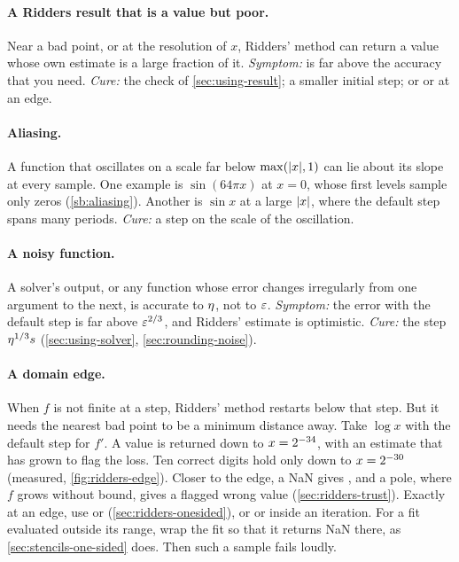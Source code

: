 \paragraph{A Ridders result that is a value but poor.} Near a bad point, or at the resolution of $x$, Ridders'
method can return a value whose own estimate is a large fraction of it. \emph{Symptom:}  is far
above the accuracy that you need. \emph{Cure:} the check of \cref{sec:using-result}; a smaller initial step; or
 or  at an edge.


\paragraph{Aliasing.} A function that oscillates on a scale far below $\max(\lvert x \rvert, 1)$ can lie about its slope
at every sample. One example is $\sin(64 \pi x)$ at $x = 0$, whose first levels sample only zeros
(\cref{sb:aliasing}). Another is $\sin x$ at a large $\lvert x \rvert$, where the default step spans many periods.
\emph{Cure:} a step on the scale of the oscillation.

\paragraph{A noisy function.} A solver's output, or any function whose error changes irregularly from one argument
to the next, is accurate to $\eta$, not to $\varepsilon$.
\emph{Symptom:} the error with the default step is far above $\varepsilon^{2/3}$, and Ridders' estimate is optimistic.
\emph{Cure:} the step $\eta^{1/3} s$
(\cref{sec:using-solver}, \cref{sec:rounding-noise}).

\paragraph{A domain edge.} When $f$ is not finite at a step, Ridders' method restarts below that step. But it needs
the nearest bad point to be a minimum distance away. Take $\log x$ with the default step for $f'$. A value is
returned down to $x = 2^{-\num{34}}$, with an estimate that has grown to flag the loss.
Ten correct digits hold only down to $x = 2^{-\num{30}}$ (measured,
\cref{fig:ridders-edge}). Closer to the edge, a NaN gives , and a pole, where $f$ grows without
bound, gives a flagged wrong value (\cref{sec:ridders-trust}). Exactly at an edge, use  or
 (\cref{sec:ridders-onesided}), or  or  inside an
iteration. For a fit evaluated outside its range, wrap the fit so that it returns NaN there, as
\cref{sec:stencils-one-sided} does. Then such a sample fails loudly.

